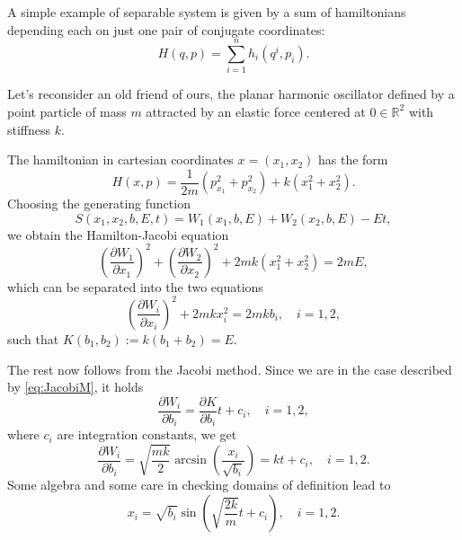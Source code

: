 \documentclass[english,fontsize=11pt,paper=a5,oneside]{scrbook}
\newcommand{\R}{\mathbb{R}}
\theoremstyle{definition}
\newenvironment{example}
  {\pushQED{\qed}\renewcommand{\qedsymbol}{$\lozenge$}\examplex}
  {\popQED\endexamplex}
\begin{document}
\begin{example}
  A simple example of separable system is given by a sum of hamiltonians depending each on just one pair of conjugate coordinates:
  \begin{equation}
    H(q,p) = \sum_{i=1}^n h_i(q^i, p_i).
  \end{equation}
\end{example}

\begin{example}[Planar harmonic oscillator]\label{ex:integrabilitypho}
  Let's reconsider an old friend of ours, the planar harmonic oscillator defined by a point particle of mass $m$ attracted by an elastic force centered at $0\in\R^2$ with stiffness $k$.

  The hamiltonian in cartesian coordinates $x=(x_1, x_2)$ has the form
  \begin{equation}
    H(x,p) = \frac{1}{2m}(p_{x_1}^2 + p_{x_2}^2) + k(x_1^2 + x_2^2).
  \end{equation}
  Choosing the generating function
  \begin{equation}
    S(x_1, x_2, b, E, t) = W_1(x_1, b, E) + W_2(x_2, b, E) - E t,
  \end{equation}
  we obtain the Hamilton-Jacobi equation
  \begin{equation}
    \left(\frac{\partial W_1}{\partial x_1}\right)^2
    + \left(\frac{\partial W_2}{\partial x_2}\right)^2
    + 2m k (x_1^2 + x_2^2) = 2m E,
  \end{equation}
  which can be separated into the two equations
  \begin{equation}
    \left(\frac{\partial W_i}{\partial x_i}\right)^2
    + 2m k x_i^2  = 2m k b_i, \quad i=1,2,
  \end{equation}
  such that $K(b_1,b_2) := k(b_1 + b_2) = E$.

  The rest now follows from the Jacobi method.
  Since we are in the case described by \eqref{eq:JacobiM}, it holds
  \begin{equation}
    \frac{\partial W_i}{\partial b_i} = \frac{\partial K}{\partial b_i}t + c_i, \quad i=1,2,
  \end{equation}
  where $c_i$ are integration constants, we get
  \begin{equation}
    \frac{\partial W_i}{\partial b_i} = \sqrt{\frac{mk}{2}}\arcsin\left(\frac{x_i}{\sqrt{b_i}}\right) = kt + c_i, \quad i=1,2.
  \end{equation}
  Some algebra and some care in checking domains of definition lead to
  \begin{equation}
    x_i = \sqrt{b_i} \sin\left(\sqrt{\frac{2k}{m}} t + c_i\right), \quad i=1,2.
  \end{equation}


\end{example}
\end{document}
